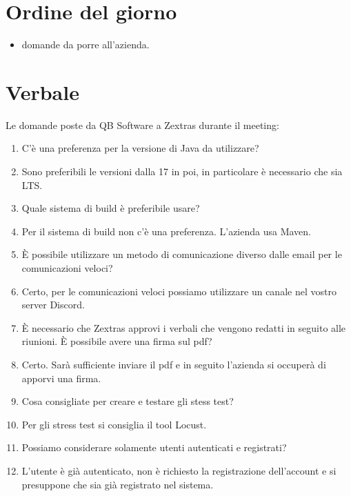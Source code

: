 \documentclass[12pt]{article}
\begin{document}
    \section{Ordine del giorno}
    \begin{itemize}
    	\item domande da porre all'azienda.
    \end{itemize}
    
    \section{Verbale}

    Le domande poste da QB Software a Zextras durante il meeting:

    \newcommand{\answer}{\item[\textbf{A:}]}
        
        \begin{enumerate}[label=\textbf{Q\arabic*:}]
            \item C'è una preferenza per la versione di Java da utilizzare?
            \answer Sono preferibili le versioni dalla 17 in poi, in particolare è necessario che sia LTS.

            \item Quale sistema di build è preferibile usare? 
            \answer Per il sistema di build non c'è una preferenza. L'azienda usa Maven.  

            \item È possibile utilizzare un metodo di comunicazione diverso dalle email per le comunicazioni veloci? 
            \answer Certo, per le comunicazioni veloci possiamo utilizzare un canale nel vostro server Discord.
        
            \item È necessario che Zextras approvi i verbali che vengono redatti in seguito alle riunioni. È possibile avere una firma sul pdf?
            \answer Certo. Sarà sufficiente inviare il pdf e in seguito l'azienda si occuperà di apporvi una firma.
            
            \item Cosa consigliate per creare e testare gli stess test?
            \answer Per gli stress test si consiglia il tool Locust.

            \item Possiamo considerare solamente utenti autenticati e registrati?
            \answer L'utente è già autenticato, non è richiesto la registrazione dell'account e si presuppone che sia già registrato nel sistema.

        \end{enumerate}
\end{document}
